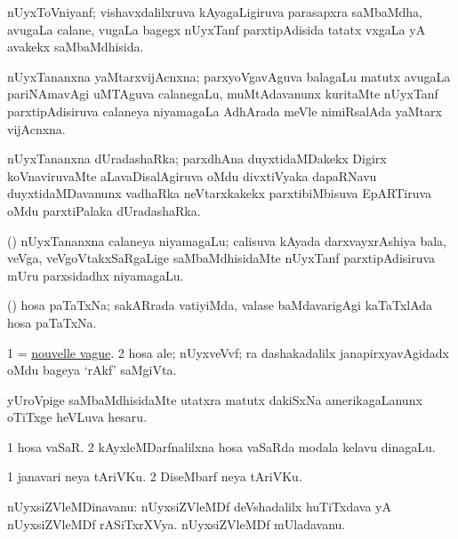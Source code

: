 \bentry
{}
\gl{\gu}
\bmng
nUyxToVniyanf; vishavxdalilxruva kAyagaLigiruva parasapxra saMbaMdha, avugaLa calane, \mo vugaLa bagegx nUyxTanf parxtipAdisida tatatx vxgaLa yA avakekx saMbaMdhisida. 
\emng
\eentry

\bentry
{}
\gl{\nA}
\bmng
nUyxTananxna yaMtarxvijAcnxna; parxyoVgavAguva balagaLu matutx avugaLa pariNAmavAgi uMTAguva calanegaLu, muMtAdavanunx kuritaMte nUyxTanf parxtipAdisiruva calaneya niyamagaLa AdhArada meVle nimiRsalAda yaMtarx vijAcnxna. 
\emng
\eentry

\bentry
{}
\gl{\nA}
\bmng
nUyxTananxna dUradashaRka; parxdhAna duyxtidaMDakekx  Digirx koVnaviruvaMte aLavaDisalAgiruva oMdu divxtiVyaka dapaRNavu duyxtidaMDavanunx vadhaRka neVtarxkakekx parxtibiMbisuva EpARTiruva oMdu parxtiPalaka dUradashaRka. 
\emng
\eentry

\bentry
{}
\gl{\nA}
\bmng
(\Bwvi) nUyxTananxna calaneya niyamagaLu; calisuva kAyada darxvayxrAshiya bala, veVga, veVgoVtakxSaRgaLige saMbaMdhisidaMte nUyxTanf parxtipAdisiruva mUru parxsidadhx niyamagaLu. 
\emng
\eentry

\bentry
{}
\gl{\nA}
\bmng
(\birx) hosa paTaTxNa; sakARrada vatiyiMda, valase baMdavarigAgi kaTaTxlAda hosa paTaTxNa. 
\emng
\eentry

\bentry
{}
\gl{\nA}
\bmng
\bnum
\num{1} = \hyperlink{nouvelle vague}{nouvelle vague}. 
\num{2} hosa ale; nUyxveVvf; ra dashakadalilx janapirxyavAgidadx oMdu bageya `rAkf' saMgiVta. 
\enum
\emng
\eentry

\bentry
{}
\gl{\nA}
\bmng
yUroVpige saMbaMdhisidaMte utatxra matutx dakiSxNa amerikagaLanunx oTiTxge heVLuva hesaru. 
\emng
\eentry

\bentry
{}
\gl{\nA}
\bmng
\bnum
\num{1} hosa vaSaR. 
\num{2} kAyxleMDarfnalilxna hosa vaSaRda modala kelavu dinagaLu. 
\enum
\emng

\noindent
\gl{\pagu}
\bmng
\bnum
\num{1}  janavari neya tAriVKu. 
\num{2}  DiseMbarf neya tAriVKu. 
\enum
\emng
\eentry
 
\bentry
{}
\gl{\nA}
\bmng
nUyxsiZVleMDinavanu: 
\banum
{} nUyxsiZVleMDf deVshadalilx huTiTxdava yA nUyxsiZVleMDf rASiTxrXVya. 
 nUyxsiZVleMDf mUladavanu. 
\eanum
\emng
\eentry

